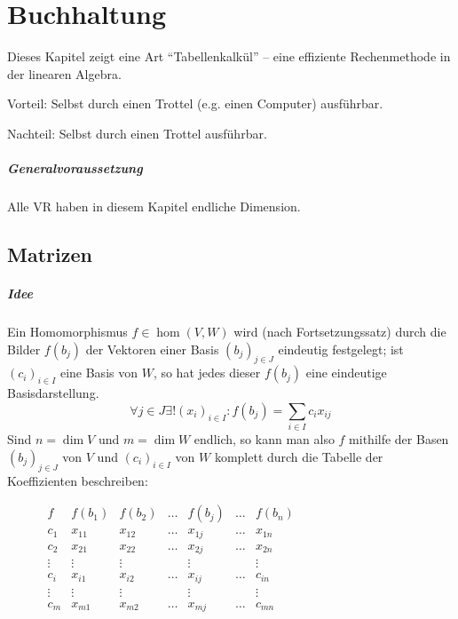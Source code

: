 \chapter{Buchhaltung}
	Dieses Kapitel zeigt eine Art "`Tabellenkalkül"' -- eine effiziente Rechenmethode in der linearen Algebra.
	
	Vorteil: Selbst durch einen Trottel (e.g. einen Computer) ausführbar. 
	
	Nachteil: Selbst durch einen Trottel ausführbar.
	
\paragraph{Generalvoraussetzung} Alle VR haben in diesem Kapitel endliche Dimension.
\section{Matrizen}
\paragraph{Idee}
	Ein Homomorphismus $ f\in \hom(V,W) $ wird (nach Fortsetzungssatz) durch die Bilder $ f(b_j) $ der Vektoren einer Basis $ (b_j)_{j\in J} $ eindeutig festgelegt; ist $ (c_i)_{i\in I} $ eine Basis von $ W $, so hat jedes dieser $ f(b_j) $ eine eindeutige Basisdarstellung.
		\[ \forall {j\in J}\exists! (x_i)_{i\in I}:f(b_j) = \sum_{i\in I}c_ix_{ij} \]
	Sind $ n=\dim V $ und $ m=\dim W $ endlich, so kann man also $ f $ mithilfe der Basen $ (b_j)_{j\in J} $ von $ V $ und $ (c_i)_{i\in I} $ von $ W $ komplett durch die Tabelle der Koeffizienten beschreiben:
	
	\begin{figure}[H]\centering
		$ \begin{array}{c|cccccc}
		f		& f(b_1) 	& f(b_2) 	& \dots 	& f(b_j)	& \dots	& f(b_n) \\\hline
		c_1  	& x_{11}  	& x_{12}	& \dots		& x_{1j}	& \dots	& x_{1n} \\
		c_2		& x_{21}	& x_{22}	& \dots		& x_{2j}	& \dots	& x_{2n} \\
		\vdots  &  \vdots	&  \vdots	&			&  \vdots	&		&  \vdots \\
		c_i		&  x_{i1}	&  x_{i2}	& \dots		&  x_{ij}	&\dots  &  c_{in} \\
		\vdots	&  \vdots	&  \vdots	&			&  \vdots	&		&  \vdots \\
		c_m		&  x_{m1}	&  x_{m2}	& \dots		&  x_{mj}	& \dots	&  c_{mn} 
		\end{array} $
	\end{figure}
	
